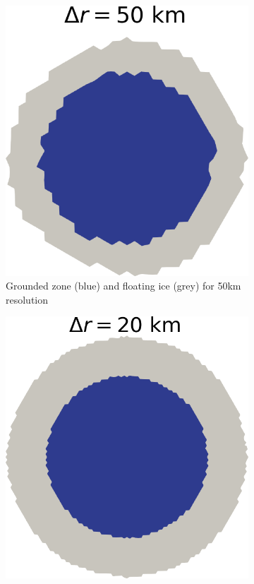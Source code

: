 \documentclass{article}
\begin{document}
\begin{figure}[!h]
	\centering %
	\begin{subfigure}{0.25\textwidth}
		\includegraphics[width=\linewidth]{../fig/Grounded_zone_50km_CONE.png}
		\caption{Grounded zone (blue) and floating ice (grey) for 50km resolution}
		\label{figCONE50KM}
	\end{subfigure}\hfil %
	\begin{subfigure}{0.25\textwidth}
		\includegraphics[width=\linewidth]{../fig/Grounded_zone_20km_CONE.png}

\end{subfigure}
\end{figure}
\end{document}
